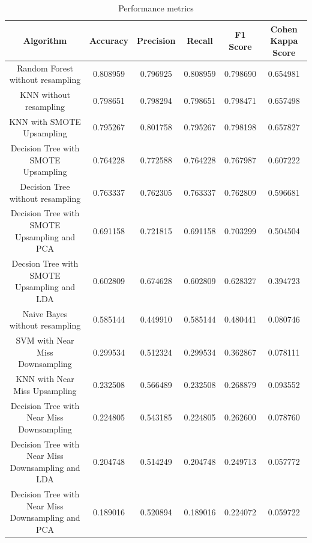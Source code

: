 \documentclass{article}
\begin{document}
\begin{table}[htbp]
\centering
\small
\setlength{\tabcolsep}{3pt}
\renewcommand{\arraystretch}{1.2}
\begin{adjustbox}{width=\textwidth}
\begin{tabular}{|c|c|c|c|c|c|}
\hline
\textbf{Algorithm} & \textbf{Accuracy} & \textbf{Precision} & \textbf{Recall} & \textbf{F1 Score} & \textbf{Cohen Kappa Score} \\ \hline
Random Forest without resampling & 0.808959 & 0.796925 & 0.808959 & 0.798690 & 0.654981 \\
KNN without resampling & 0.798651 & 0.798294 & 0.798651 & 0.798471 & 0.657498 \\
KNN with SMOTE Upsampling & 0.795267 & 0.801758 & 0.795267 & 0.798198 & 0.657827 \\
Decision Tree with SMOTE Upsampling & 0.764228 & 0.772588 & 0.764228 & 0.767987 & 0.607222 \\
Decision Tree without resampling & 0.763337 & 0.762305 & 0.763337 & 0.762809 & 0.596681 \\
Decision Tree with SMOTE Upsampling and PCA & 0.691158 & 0.721815 & 0.691158 & 0.703299 & 0.504504 \\
Decsion Tree with SMOTE Upsampling and LDA & 0.602809 & 0.674628 & 0.602809 & 0.628327 & 0.394723 \\
Naive Bayes without resampling & 0.585144 & 0.449910 & 0.585144 & 0.480441 & 0.080746 \\
SVM with Near Miss Downsampling & 0.299534 & 0.512324 & 0.299534 & 0.362867 & 0.078111 \\
KNN with Near Miss Upsampling & 0.232508 & 0.566489 & 0.232508 & 0.268879 & 0.093552 \\
Decision Tree with Near Miss Downsampling & 0.224805 & 0.543185 & 0.224805 & 0.262600 & 0.078760 \\
Decision Tree with Near Miss Downsampling and LDA & 0.204748 & 0.514249 & 0.204748 & 0.249713 & 0.057772 \\
Decision Tree with Near Miss Downsampling and PCA & 0.189016 & 0.520894 & 0.189016 & 0.224072 & 0.059722 \\
\hline
\end{tabular}
\end{adjustbox}
\caption{Performance metrics}
\label{tab:Performance metrics}
\end{table}
\end{document}
